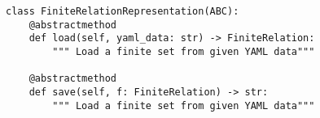 \par\begin{minipage}{60ex}
\begin{verbatim}
class FiniteRelationRepresentation(ABC):
    @abstractmethod
    def load(self, yaml_data: str) -> FiniteRelation:
        """ Load a finite set from given YAML data"""

    @abstractmethod
    def save(self, f: FiniteRelation) -> str:
        """ Load a finite set from given YAML data"""
\end{verbatim}
\end{minipage}\par